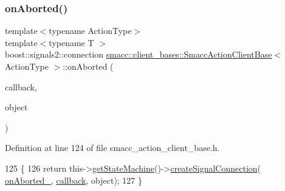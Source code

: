 \subsubsection{\texorpdfstring{on\+Aborted()}{onAborted()}\hspace{0.1cm}{\footnotesize\ttfamily [1/2]}}
{\footnotesize\ttfamily template$<$typename Action\+Type$>$ \\
template$<$typename T $>$ \\
boost\+::signals2\+::connection \hyperlink{classsmacc_1_1client__bases_1_1SmaccActionClientBase}{smacc\+::client\+\_\+bases\+::\+Smacc\+Action\+Client\+Base}$<$ Action\+Type $>$\+::on\+Aborted (\begin{DoxyParamCaption}\item[{void(T\+::$\ast$)(Result\+Const\+Ptr \&)}]{callback,  }\item[{T $\ast$}]{object }\end{DoxyParamCaption})\hspace{0.3cm}{\ttfamily [inline]}}



Definition at line 124 of file smacc\+\_\+action\+\_\+client\+\_\+base.\+h.


\begin{DoxyCode}
125     \{
126         \textcolor{keywordflow}{return} this->\hyperlink{classsmacc_1_1ISmaccClient_aec51d4712404cb9882b86e4c854bb93a}{getStateMachine}()->\hyperlink{classsmacc_1_1ISmaccStateMachine_adf0f42ade0c65cc471960fe2a7c42da2}{createSignalConnection}(
      \hyperlink{classsmacc_1_1client__bases_1_1SmaccActionClientBase_adc33748ca4fcef9730f8039b75d496d0}{onAborted\_}, \hyperlink{sm__ridgeback__barrel__search__1_2servers_2opencv__perception__node_2opencv__perception__node_8cpp_a050e697bd654facce10ea3f6549669b3}{callback}, \textcolor{keywordtype}{object});
127     \}
\end{DoxyCode}
\mbox{\label{classsmacc_1_1client__bases_1_1SmaccActionClientBase_a67661e9415e2f2c2a1fede92a1b3dd1d}} 
